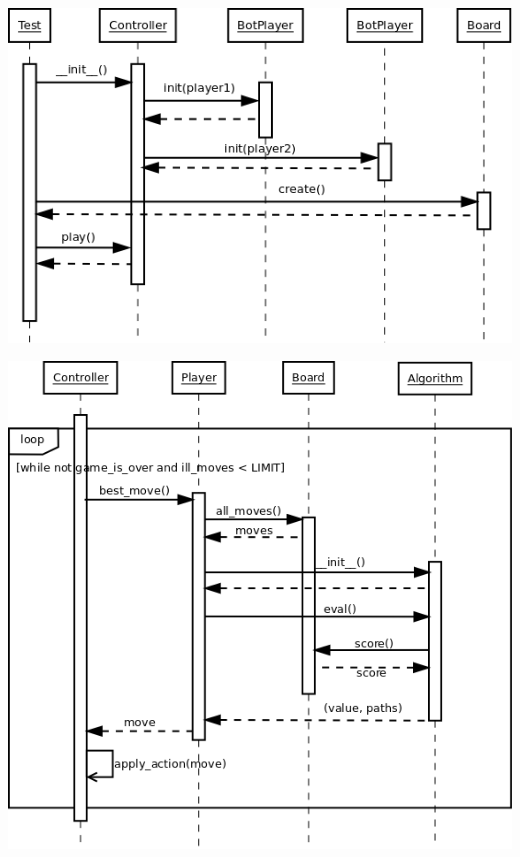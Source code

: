 \begin{minipage}[]{1.0\textwidth}

    \centering
    \begin{minipage}[t]{0.7\textwidth}
        \includegraphics[width=\textwidth]{images/program_flow_01.png}
\label{fig:program_flow_01}
    \end{minipage}

    \hspace{1cm}

    \begin{minipage}[t]{0.8\textwidth}
\label{fig:program_flow_02}
        \includegraphics[width=\textwidth]{images/program_flow_02.png}
\label{fig:program_flow_02}
    \end{minipage}
\end{minipage}
\addtocounter{footnote}{-2} %
